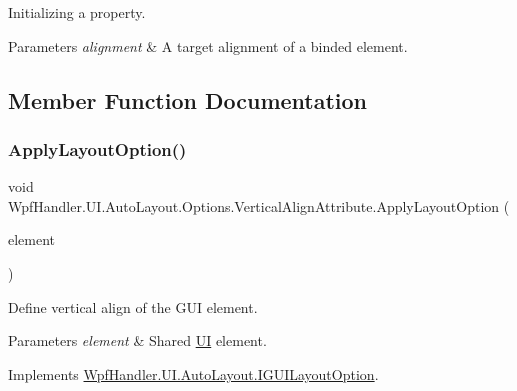 Initializing a property. 


\begin{DoxyParams}{Parameters}
{\em alignment} & A target alignment of a binded element.\\
\hline
\end{DoxyParams}


\subsection{Member Function Documentation}
\mbox{\label{class_wpf_handler_1_1_u_i_1_1_auto_layout_1_1_options_1_1_vertical_align_attribute_a5a37e0bcf32b49da94e4f4d539fe810c}} 
\subsubsection{\texorpdfstring{Apply\+Layout\+Option()}{ApplyLayoutOption()}}
{\footnotesize\ttfamily void Wpf\+Handler.\+U\+I.\+Auto\+Layout.\+Options.\+Vertical\+Align\+Attribute.\+Apply\+Layout\+Option (\begin{DoxyParamCaption}\item[{Framework\+Element}]{element }\end{DoxyParamCaption})}



Define vertical align of the G\+UI element. 


\begin{DoxyParams}{Parameters}
{\em element} & Shared \mbox{\hyperlink{namespace_wpf_handler_1_1_u_i}{UI}} element.\\
\hline
\end{DoxyParams}


Implements \mbox{\hyperlink{interface_wpf_handler_1_1_u_i_1_1_auto_layout_1_1_i_g_u_i_layout_option_ac2d2fa8aeaf753b3248381399f991005}{Wpf\+Handler.\+U\+I.\+Auto\+Layout.\+I\+G\+U\+I\+Layout\+Option}}.



